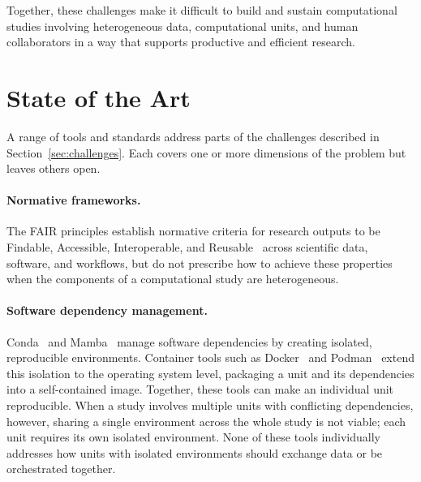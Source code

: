 \documentclass{eceasst}
\begin{document}
\medskip
Together, these challenges make it difficult to build and sustain computational
studies involving heterogeneous data, computational units, and human collaborators
in a way that supports productive and efficient research.


\section{State of the Art}
\label{sec:stateoftheart}

A range of tools and standards address parts of the challenges described in
Section~\ref{sec:challenges}. Each covers one or more dimensions of the problem
but leaves others open.

\paragraph{Normative frameworks.}
The FAIR principles establish normative criteria for research outputs to be
Findable, Accessible, Interoperable, and
Reusable~\cite{wilkinson2016fair,barker2022fair4rs,goble2020fairworkflows,wilkinson2025fairworkflows}
across scientific data, software, and workflows, but do not prescribe how to achieve these properties when the components of a
computational study are heterogeneous.

\paragraph{Software dependency management.}
Conda~\cite{conda} and Mamba~\cite{mamba} manage software dependencies by
creating isolated, reproducible environments. Container tools such as
Docker~\cite{merkel2014docker} and Podman~\cite{heon2018podman} extend this
isolation to the operating system level, packaging a unit and its dependencies
into a self-contained image. Together, these tools can make an individual unit
reproducible. When a study involves multiple units with conflicting dependencies,
however, sharing a single environment across the whole study is not viable; each
unit requires its own isolated environment. None of these tools individually
addresses how units with isolated environments should exchange data or be
orchestrated together.
\end{document}
